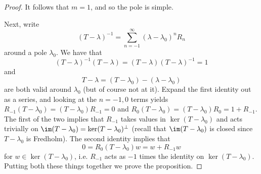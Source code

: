\documentclass[12pt]{article}
\begin{document}
\begin{proof}
It follows that $m=1$, and so the pole is simple.

Next, write
\[(T-\lambda)^{-1} = \sum_{n=-1}^\infty (\lambda - \lambda_0)^nR_n\] around a pole $\lambda_0$. We have that
\[(T-\lambda)^{-1}(T-\lambda) = (T-\lambda)(T-\lambda)^{-1} = 1\]
and
\[T-\lambda = (T-\lambda_0)-(\lambda-\lambda_0)\]
are both valid around $\lambda_0$ (but of course not at it). Expand the first identity out as a series, and looking at the $n=-1,0$ terms yields $R_{-1}(T-\lambda_0) = (T-\lambda_0)R_{-1} = 0$ and $R_0(T-\lambda_0)=(T-\lambda_0)R_0 = 1+R_{-1}$.
The first of the two implies that $R_{-1}$ takes values in $\ker(T-\lambda_0)$ and acts trivially on $\im (T-\lambda_0) = \ker (T-\lambda_0)^{\bot}$ (recall that $\im (T-\lambda_0)$ is closed since $T-\lambda_0$ is Fredholm). The second identity implies that
\[0 = R_0(T-\lambda_0)w = w+R_{-1}w\] for $w \in \ker (T-\lambda_0)$, i.e. $R_{-1}$ acts as $-1$ times the identity on $\ker(T-\lambda_0)$. Putting both these things together we prove the proposition.
\end{proof}
\end{document}
